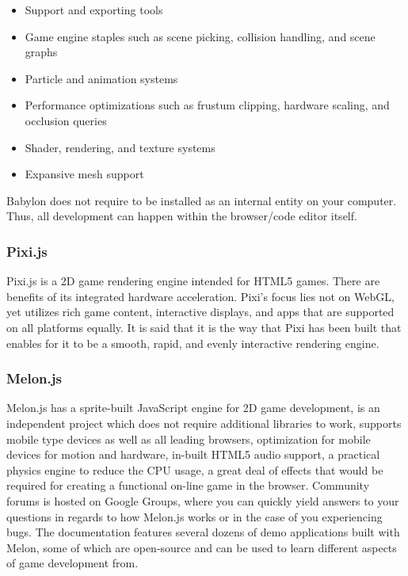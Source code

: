 \begin{itemize}
    \item Support and exporting tools
    \item Game engine staples such as scene picking, collision handling, and scene graphs
    \item Particle and animation systems
    \item Performance optimizations such as frustum clipping, hardware scaling, and occlusion queries
    \item Shader, rendering, and texture systems
    \item Expansive mesh support
\end{itemize}

Babylon does not require to be installed as an internal entity on your computer.
Thus, all development can happen within the browser/code editor itself\cite{phaserad}.

\subsubsection{Pixi.js}
Pixi.js is a 2D game rendering engine intended for HTML5 games.
There are benefits of its integrated hardware acceleration.
Pixi’s focus lies not on WebGL, yet utilizes rich game content, interactive displays,
and apps that are supported on all platforms equally.
It is said that it is the way that Pixi has been built that enables for it to be a smooth, rapid, and evenly interactive rendering engine\cite{phaserad}.

\subsubsection{Melon.js}
Melon.js has a sprite-built JavaScript engine for 2D game development,
is an independent project which does not require additional libraries to work,
supports mobile type devices as well as all leading browsers,
optimization for mobile devices for motion and hardware,
in-built HTML5 audio support,
a practical physics engine to reduce the CPU usage,
a great deal of effects that would be required for creating a
functional on-line game in the browser.
Community forums is hosted on Google Groups, where you can quickly yield answers to your questions in regards to how Melon.js works or in the case of you experiencing bugs.
The documentation features several dozens of demo applications built with Melon,
some of which are open-source and can be used to learn different aspects of game development from\cite{phaserad}.

